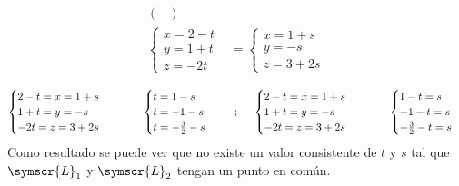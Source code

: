 \documentclass{article}
\def\fancyL{\symscr{L}}
\begin{document}
\begin{enumerate}
\[\begin{aligned}
\begin{pmatrix}
                \end{pmatrix} \\
                \begin{cases}
                    x = 2 -t \\
                    y = 1 + t \\
                    z = -2t
                \end{cases}
                &=
                \begin{cases}
                    x = 1 + s \\
                    y = -s \\
                    z = 3 + 2s
                \end{cases} \\
            \end{aligned}
        \]
        \[
            \begin{cases}
                2 -t = x = 1 + s \\
                1 + t = y = -s \\
                -2t = z = 3 + 2s
            \end{cases}
            \hspace{1cm}
            \begin{cases}
                t = 1 - s \\
                t = -1 - s \\
                t = -\frac{3}{2} - s
            \end{cases}
            \hspace{0.5cm}
            \text{;}
            \hspace{0.5cm}
            \begin{cases}
                2 -t = x = 1 + s \\
                1 + t = y = -s \\
                -2t = z = 3 + 2s
            \end{cases}
            \hspace{1cm}
            \begin{cases}
                1 -t = s \\
                -1 - t = s \\
                -\frac{3}{2} - t = s
            \end{cases}
        \]
        Como resultado se puede ver que no existe un valor consistente de \(t\) y \(s\) tal que \(\fancyL_1\) y \(\fancyL_2\) tengan un punto en común.


\end{enumerate}
\end{document}
